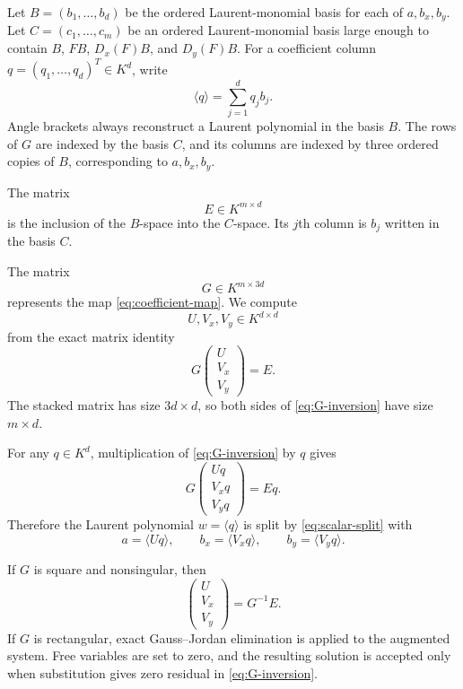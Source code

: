 \documentclass[11pt]{article}
\newcommand{\Dx}{D_x}
\newcommand{\Dy}{D_y}
\begin{document}
Let $B=(b_1,\ldots,b_d)$ be the ordered
Laurent-monomial basis for each of $a,b_x,b_y$.  Let
$C=(c_1,\ldots,c_m)$ be an ordered Laurent-monomial basis large enough
to contain $B$, $FB$, $\Dx(F)B$, and $\Dy(F)B$.  For a coefficient
column $q=(q_1,\ldots,q_d)^T\in K^d$, write
\[
  \langle q\rangle=\sum_{j=1}^d q_jb_j.
\]
Angle brackets always reconstruct a Laurent polynomial in the basis $B$.
The rows of $G$ are indexed by the basis $C$, and its columns are indexed
by three ordered copies of $B$, corresponding to $a,b_x,b_y$.

The matrix
\[
  E\in K^{m\times d}
\]
is the inclusion of the $B$-space into the $C$-space.  Its $j$th column
is $b_j$ written in the basis $C$.

The matrix
\[
  G\in K^{m\times3d}
\]
represents the map \eqref{eq:coefficient-map}.  We compute
\[
  U,V_x,V_y\in K^{d\times d}
\]
from the exact matrix identity
\begin{equation}\label{eq:G-inversion}
  G
  \begin{pmatrix}U\\V_x\\V_y\end{pmatrix}=E.
\end{equation}
The stacked matrix has size $3d\times d$, so both sides of
\eqref{eq:G-inversion} have size $m\times d$.

For any $q\in K^d$, multiplication of \eqref{eq:G-inversion} by $q$
gives
\[
  G
  \begin{pmatrix}Uq\\V_xq\\V_yq\end{pmatrix}=Eq.
\]
Therefore the Laurent polynomial $w=\langle q\rangle$ is split by
\eqref{eq:scalar-split} with
\[
  a=\langle Uq\rangle,
  \qquad
  b_x=\langle V_xq\rangle,
  \qquad
  b_y=\langle V_yq\rangle.
\]

If $G$ is square and nonsingular, then
\[
  \begin{pmatrix}U\\V_x\\V_y\end{pmatrix}=G^{-1}E.
\]
If $G$ is rectangular, exact Gauss--Jordan elimination is applied to the
augmented system.  Free variables are set to zero, and the resulting
solution is accepted only when substitution gives zero residual in
\eqref{eq:G-inversion}.
\end{document}
